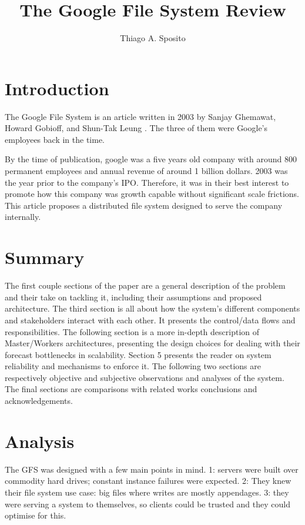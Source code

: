 \documentclass[12pt]{article}
\title{The Google File System Review}
\author{Thiago A. Sposito\inst{1} }
\begin{document}
 

\maketitle


\section{Introduction}

The Google File System is an article written in 2003 by Sanjay Ghemawat, Howard Gobioff, and Shun-Tak Leung \cite{ghemawat2003google}. The three of them were Google's employees back in the time.

By the time of publication, google was a five years old company with around 800 permanent employees \cite{google_coorp_info} and annual revenue of around 1 billion dollars. 2003 was the year prior to the company's IPO\cite{katje_2020}. Therefore, it was in their best interest to promote how this company was growth capable without significant scale frictions. This article proposes a distributed file system designed to serve the company internally.

\section{Summary} 
The first couple sections of the paper are a general description of the problem and their take on tackling it, including their assumptions and proposed architecture. The third section is all about how the system's different components and stakeholders interact with each other. It presents the control/data flows and responsibilities. The following section is a more in-depth description of Master/Workers architectures, presenting the design choices for dealing with their forecast bottlenecks in scalability. Section 5 presents the reader on system reliability and mechanisms to enforce it. The following two sections are respectively objective and subjective observations and analyses of the system. The final sections are comparisons with related works conclusions and acknowledgements. 


\section{Analysis}
The GFS was designed with a few main points in mind. 1: servers were built over commodity hard drives; constant instance failures were expected. 2: They knew their file system use case: big files where writes are mostly appendages. 3: they were serving a system to themselves, so clients could be trusted and they could optimise for this.
\end{document}
